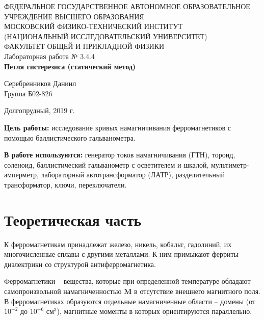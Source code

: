 \documentclass[a4paper,12pt]{article} %
\begin{document}
\begin{center}
	\footnotesize{ФЕДЕРАЛЬНОЕ ГОСУДАРСТВЕННОЕ АВТОНОМНОЕ ОБРАЗОВАТЕЛЬНОЕ 			УЧРЕЖДЕНИЕ ВЫСШЕГО ОБРАЗОВАНИЯ}\\
	\footnotesize{МОСКОВСКИЙ ФИЗИКО-ТЕХНИЧЕСКИЙ ИНСТИТУТ\\(НАЦИОНАЛЬНЫЙ 			ИССЛЕДОВАТЕЛЬСКИЙ УНИВЕРСИТЕТ)}\\
	\footnotesize{ФАКУЛЬТЕТ ОБЩЕЙ И ПРИКЛАДНОЙ ФИЗИКИ\\}
	\hfill \break
	\hfill\break
	\hfill\break
	\hfill \break
	\hfill \break
	\hfill \break
	\hfill \break
	\hfill \break
	\hfill \break
	\hfill \break
	\hfill \break
	\hfill \break
	\hfill \break
	\hfill \break
	\large{Лабораторная работа № 3.4.4\\\textbf{Петля гистерезиса (статический метод)}}\\
	\hfill \break
	\hfill \break
	\hfill \break
	\begin{flushright}
		Серебренников Даниил\\
		Группа Б02-826
	\end{flushright}
	\hfill \break
	\hfill \break
	\hfill \break
	\hfill \break
	\hfill \break
\end{center}
\hfill \break
\hfill \break
\hfill \break
\hfill \break
\hfill \break
\hfill \break
\begin{center}
	Долгопрудный, 2019 г.
\end{center}
\thispagestyle{empty}
\newpage

\textbf{Цель работы:} исследование кривых намагничивания ферромагнетиков с помощью баллистического гальванометра.

\textbf{В работе используются:} генератор токов намагничивания (ГТН), тороид, соленоид, баллистический гальванометр с осветителем и шкалой, мультиметр-амперметр, лабораторный автотрансформатор (ЛАТР), разделительный трансформатор, ключи, переключатели.


\section{Теоретическая часть}
	К ферромагнетикам принадлежат железо, никель, кобальт, гадолиний, их многочисленные сплавы с другими металлами. К ним примыкают ферриты -- диэлектрики со структурой антиферромагнетика.
	
	Ферромагнетики -- вещества, которые при определенной температуре обладают самопроизвольной намагниченностью $\boldsymbol{M}$ в отсутствие внешнего магнитного поля. В ферромагнетиках образуются отдельные намагниченные области – домены (от $10^{-2}$ до $10^{-6}$ см$^3$), магнитные моменты в которых ориентируются параллельно.
	
\end{document}
